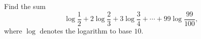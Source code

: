 Find the sum
\[\log\dfrac12+2\log\dfrac23+3\log\dfrac34+\cdots+99\log\dfrac{99}{100},\]
where $\log$ denotes the logarithm to base $10$.
